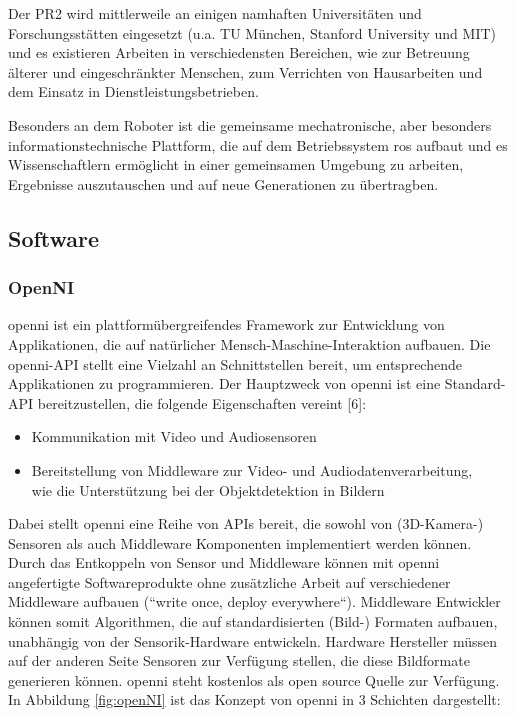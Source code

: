 Der PR2 wird mittlerweile an einigen namhaften Universitäten und Forschungsstätten eingesetzt
 (u.a. TU München, Stanford University und MIT) und es existieren Arbeiten in verschiedensten Bereichen,
 wie zur Betreuung älterer und eingeschränkter Menschen, zum Verrichten von Hausarbeiten  und dem Einsatz
 in Dienstleistungsbetrieben.

Besonders an dem Roboter ist die gemeinsame mechatronische, aber besonders informationstechnische Plattform,
 die auf dem Betriebssystem \gls{ros} aufbaut und es Wissenschaftlern
 ermöglicht in einer gemeinsamen Umgebung zu arbeiten, Ergebnisse auszutauschen und auf neue Generationen zu übertragben.

\subsection{Software}

\subsubsection{OpenNI}

\gls{openni} ist ein plattformübergreifendes Framework zur Entwicklung von
Applikationen, die auf natürlicher Mensch-Maschine-Interaktion aufbauen.
 Die \gls{openni}-API stellt eine Vielzahl an Schnittstellen bereit, um
 entsprechende Applikationen zu programmieren. Der Hauptzweck von \gls{openni}
  ist eine Standard-API bereitzustellen, die folgende Eigenschaften vereint [6]:

\begin{itemize}
  \item Kommunikation mit Video und Audiosensoren
  \item Bereitstellung von Middleware zur Video- und Audiodatenverarbeitung,\\
  wie die Unterstützung bei der Objektdetektion in Bildern
\end{itemize}

Dabei stellt \gls{openni} eine Reihe von APIs bereit, die sowohl von  (3D-Kamera-)
 Sensoren als auch Middleware Komponenten implementiert werden können.
 Durch das Entkoppeln von Sensor und Middleware können mit \gls{openni} angefertigte Softwareprodukte
 ohne zusätzliche Arbeit auf verschiedener Middleware aufbauen (“write once, deploy everywhere“).
 Middleware Entwickler können somit Algorithmen, die auf standardisierten (Bild-) Formaten aufbauen,
 unabhängig von der Sensorik-Hardware entwickeln. Hardware Hersteller müssen auf der anderen Seite
 Sensoren zur Verfügung stellen, die diese Bildformate generieren können. \gls{openni} steht kostenlos
 als open source Quelle zur Verfügung. In Abbildung \ref{fig:openNI} ist das
 Konzept von \gls{openni} in 3 Schichten dargestellt:

